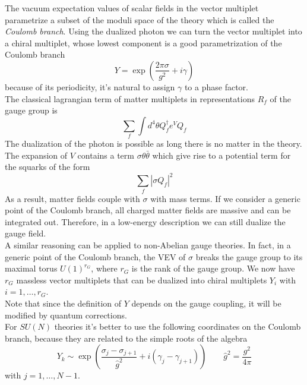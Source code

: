 The  vacuum expectation values of scalar fields in the vector multiplet parametrize a subset of the moduli space of the theory which is called the \emph{Coulomb branch}.
Using the dualized photon we can turn the vector multiplet into a chiral multiplet, whose lowest component is a good parametrization of the Coulomb branch 
\begin{equation}
 Y = \exp{ \left( \frac{2 \pi \sigma}{g^2} + i \gamma \right)}
\end{equation}
because of its periodicity, it's natural to assign $\gamma$ to a phase factor.\\
The classical lagrangian term of matter multiplets in representations $R_f$ of the gauge group is
\begin{equation}
\sum_f \int d^4 \theta Q^{\dagger}_f  e^{V} Q_{f}
\end{equation}
The dualization of the photon is possible as long there is no matter in the theory.\\
The expansion of $V$ contains a term $\sigma \theta \bar{\theta}$ which give rise to a potential term for the squarks of the form
\begin{equation}
\sum_f | \sigma Q_f|^2
\end{equation}
As a result, matter fields couple with $\sigma$ with mass terms. 
If we consider a generic point of the Coulomb branch, all charged matter fields are massive and can be integrated out.
Therefore, in a low-energy description we can still dualize the gauge field.\\
A similar reasoning can be applied to non-Abelian gauge theories.
In fact, in a generic point of the Coulomb branch, the VEV of $\sigma$ breaks the gauge group to its maximal torus $U(1)^{r_G}$, where $r_G$ is the rank of the gauge group. 
We now have $r_G$ massless vector multiplets that can be dualized into chiral multiplets $Y_i$ with $i=1,\dotsc,r_G$.
\\
Note that since the definition of $Y$ depends on the gauge coupling, it will be modified by quantum corrections.
\\
For $ SU(N)$ theories it's better to use the following coordinates on the Coulomb branch, because they are related to the simple roots of the algebra
\begin{equation}
 Y_k \sim \exp \left( \frac{\sigma_j- \sigma_{j+1}}{\hat{g}^2} + i ( \gamma_j - \gamma_{j+1} )   \right) \qquad \hat{g}^2 =  \frac{g^2}{4 \pi}
\label{eqn:Y_def_sun_theories}
\end{equation}
with $j = 1, \dotsc , N -1$.\\
